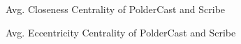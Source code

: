 \begin{figure}[H]
    \centering
    
    \caption{Avg. Closeness Centrality of PolderCast and Scribe}
    \label{fig:eval_closeness}
\end{figure}

\begin{figure}[H]
    \centering
    
    \caption{Avg. Eccentricity Centrality of PolderCast and Scribe}
    \label{fig:eval_eccentricity}
\end{figure}

